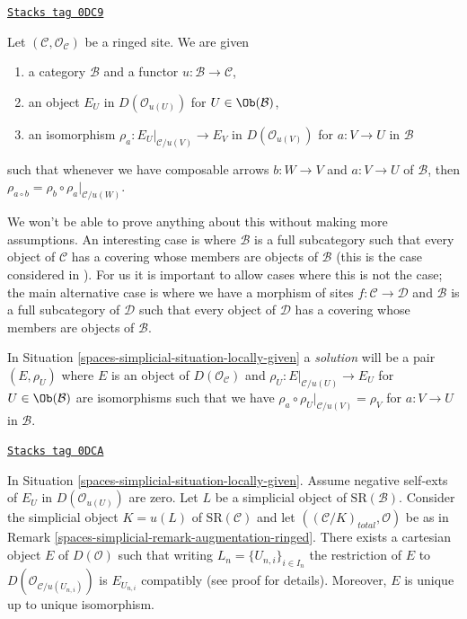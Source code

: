 \begin{definition}
\label{spaces-simplicial-situation-locally-given}
\href{https://stacks.math.columbia.edu/tag/0DC9}{\texttt{Stacks tag 0DC9}}

Let $(\mathcal{C}, \mathcal{O}_\mathcal{C})$ be a ringed site. We are given
\begin{enumerate}
\item a category $\mathcal{B}$ and a functor
$u : \mathcal{B} \to \mathcal{C}$,
\item an object $E_U$ in $D(\mathcal{O}_{u(U)})$ for $U \in \Ob(\mathcal{B})$,
\item an isomorphism $\rho_a : E_U|_{\mathcal{C}/u(V)} \to E_V$ in
$D(\mathcal{O}_{u(V)})$ for $a : V \to U$ in $\mathcal{B}$
\end{enumerate}
such that whenever we have composable arrows
$b : W \to V$ and $a : V \to U$ of $\mathcal{B}$, then
$\rho_{a \circ b} = \rho_b \circ \rho_a|_{\mathcal{C}/u(W)}$.
\end{definition}

We won't be able to prove anything about this without making more
assumptions. An interesting case is where $\mathcal{B}$ is a full
subcategory such that every object of $\mathcal{C}$ has a covering
whose members are objects of $\mathcal{B}$ (this is the case considered
in \cite{BBD}). For us it is important to allow cases where this is not
the case; the main alternative case is where we have a morphism
of sites $f : \mathcal{C} \to \mathcal{D}$ and $\mathcal{B}$
is a full subcategory of $\mathcal{D}$ such that every object of
$\mathcal{D}$ has a covering whose members are objects of $\mathcal{B}$.

\medskip\noindent
In Situation \ref{spaces-simplicial-situation-locally-given} a {\it solution}
will be a pair $(E, \rho_U)$ where $E$ is an object of
$D(\mathcal{O}_\mathcal{C})$
and $\rho_U : E|_{\mathcal{C}/u(U)} \to E_U$
for $U \in \Ob(\mathcal{B})$
are isomorphisms such that
we have $\rho_a \circ \rho_U|_{\mathcal{C}/u(V)} = \rho_V$
for $a : V \to U$ in $\mathcal{B}$.

\begin{lemma}
\label{spaces-simplicial-lemma-prepare-bbd-glueing}
\href{https://stacks.math.columbia.edu/tag/0DCA}{\texttt{Stacks tag 0DCA}}

In Situation \ref{spaces-simplicial-situation-locally-given}.
Assume negative self-exts of $E_U$ in $D(\mathcal{O}_{u(U)})$ are zero.
Let $L$ be a simplicial object of $\text{SR}(\mathcal{B})$.
Consider the simplicial object $K = u(L)$ of $\text{SR}(\mathcal{C})$
and let $((\mathcal{C}/K)_{total}, \mathcal{O})$ be as in
Remark \ref{spaces-simplicial-remark-augmentation-ringed}.
There exists a cartesian object $E$ of $D(\mathcal{O})$
such that writing $L_n = \{U_{n, i}\}_{i \in I_n}$
the restriction of $E$ to $D(\mathcal{O}_{\mathcal{C}/u(U_{n, i})})$
is $E_{U_{n, i}}$ compatibly (see proof for details).
Moreover, $E$ is unique up to unique isomorphism.
\end{lemma}


